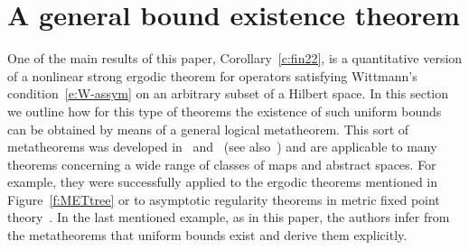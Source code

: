 \section{A general bound existence theorem}\label{s:meta}

One of the main results of this paper, Corollary~\ref{c:fin22}, is a quantitative version
of a nonlinear strong ergodic theorem for 
operators satisfying Wittmann's condition~\eqref{e:W-assym} 
on an arbitrary subset of a Hilbert space. In this section
we outline how for this type of theorems the existence of such uniform bounds 
can be obtained by means of a general logical metatheorem. This sort of 
metatheorems was developed in~\cite{Kohlenbach05meta} and~\cite{GK08} (see also~\cite{Kohlenbach08})
and are applicable to many theorems concerning a wide range of classes of maps and abstract spaces. 
For example, they were successfully applied to 
the ergodic theorems mentioned in Figure~\ref{f:METtree} or to 
asymptotic regularity theorems in metric fixed point theory~\cite{Kohlenbach2010}.
In the last mentioned example, as in this paper, 
the authors infer from the metatheorems that uniform bounds exist and derive them explicitly.\\
